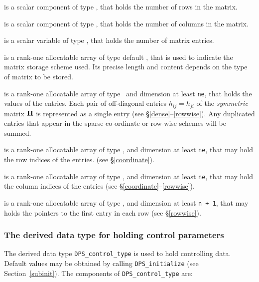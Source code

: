 \documentclass{galahad}
\newcommand{\packagename}{DPS}
\begin{document}
\begin{description}

 is a scalar component of type \integer,
that holds the number of rows in the matrix.

 is a scalar component of type \integer,
that holds the number of columns in the matrix.

 is a scalar variable of type \integer, that
holds the number of matrix entries.

 is a rank-one allocatable array of type default \character, that
is used to indicate the matrix storage scheme used. Its precise length and
content depends on the type of matrix to be stored.

 is a rank-one allocatable array of type \realdp\,
and dimension at least {\tt ne}, that holds the values of the entries.
Each pair of off-diagonal entries $h_{ij} = h_{ji}$ of the {\em symmetric}
matrix ${\mathbf{H}}$ is represented as a single entry
(see \S\ref{dense}--\ref{rowwise}).
Any duplicated entries that appear in the sparse
co-ordinate or row-wise schemes will be summed.

 is a rank-one allocatable array of type \integer,
and dimension at least {\tt ne}, that may hold the row indices of the entries.
(see \S\ref{coordinate}).

 is a rank-one allocatable array of type \integer,
and dimension at least {\tt ne}, that may hold the column indices of the entries
(see \S\ref{coordinate}--\ref{rowwise}).

 is a rank-one allocatable array of type \integer,
and dimension at least {\tt n + 1}, that may holds the pointers to
the first entry in each row (see \S\ref{rowwise}).

\end{description}


\subsubsection{The derived data type for holding control
 parameters}\label{typecontrol}
The derived data type
{\tt \packagename\_control\_type}
is used to hold controlling data. Default values may be obtained by calling
{\tt \packagename\_initialize}
(see Section~\ref{subinit}). The components of
{\tt \packagename\_control\_type}
are:
\end{document}
